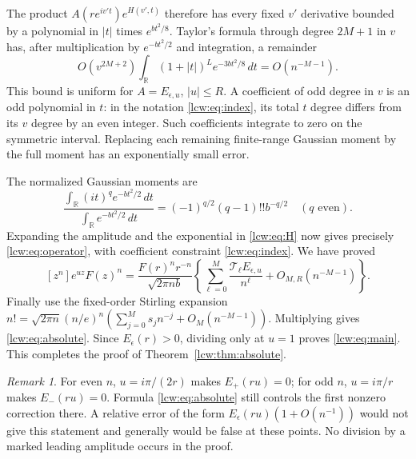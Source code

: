 \documentclass[11pt,letterpaper]{article}
\theoremstyle{remark}\newtheorem{remark}[theorem]{Remark}
\newcommand{\TT}{\mathcal T}\newcommand{\PP}{\mathcal P}
\begin{document}
The product $A(re^{iv't})e^{H(v',t)}$ therefore has every fixed $v'$ derivative bounded by a polynomial in $|t|$ times $e^{bt^2/8}$. Taylor's formula through degree $2M+1$ in $v$ has, after multiplication by $e^{-bt^2/2}$ and integration, a remainder
\[
 O(v^{2M+2})\int_{\mathbb R}(1+|t|)^L e^{-3bt^2/8}\,dt
 =O(n^{-M-1}).
\]
This bound is uniform for $A=E_{\epsilon,u}$, $|u|\le R$. A coefficient of odd degree in $v$ is an odd polynomial in $t$: in the notation \eqref{lcw:eq:index}, its total $t$ degree differs from its $v$ degree by an even integer. Such coefficients integrate to zero on the symmetric interval. Replacing each remaining finite-range Gaussian moment by the full moment has an exponentially small error.

The normalized Gaussian moments are
\[
 \frac{\int_{\mathbb R}(it)^q e^{-bt^2/2}\,dt}
 {\int_{\mathbb R}e^{-bt^2/2}\,dt}
 =(-1)^{q/2}(q-1)!!b^{-q/2}\quad(q\text{ even}).
\]
Expanding the amplitude and the exponential in \eqref{lcw:eq:H} now gives precisely \eqref{lcw:eq:operator}, with coefficient constraint \eqref{lcw:eq:index}. We have proved
\begin{equation}\label{lcw:eq:pre-stirling}
 [z^n]e^{uz}F(z)^n
 =\frac{F(r)^nr^{-n}}{\sqrt{2\pi nb}}
 \left\{\sum_{\ell=0}^M\frac{\TT_\ell E_{\epsilon,u}}{n^\ell}
 +O_{M,R}(n^{-M-1})\right\}.
\end{equation}
Finally use the fixed-order Stirling expansion
$n!=\sqrt{2\pi n}(n/e)^n(\sum_{j=0}^M s_jn^{-j}+O_M(n^{-M-1}))$.
Multiplying gives \eqref{lcw:eq:absolute}. Since $E_\epsilon(r)>0$, dividing only at $u=1$ proves \eqref{lcw:eq:main}. This completes the proof of Theorem~\ref{lcw:thm:absolute}.

\begin{remark}\label{lcw:rem:zeros}
For even $n$, $u=i\pi/(2r)$ makes $E_+(ru)=0$; for odd $n$, $u=i\pi/r$ makes $E_-(ru)=0$. Formula \eqref{lcw:eq:absolute} still controls the first nonzero correction there. A relative error of the form $E_\epsilon(ru)(1+O(n^{-1}))$ would not give this statement and generally would be false at these points. No division by a marked leading amplitude occurs in the proof.
\end{remark}
\end{document}
